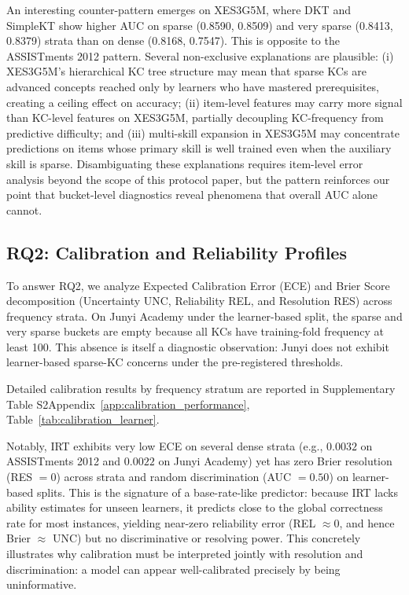 An interesting counter-pattern emerges on XES3G5M, where DKT and SimpleKT show higher AUC on sparse (0.8590, 0.8509) and very sparse (0.8413, 0.8379) strata than on dense (0.8168, 0.7547). This is opposite to the ASSISTments 2012 pattern. Several non-exclusive explanations are plausible: (i) XES3G5M's hierarchical KC tree structure may mean that sparse KCs are advanced concepts reached only by learners who have mastered prerequisites, creating a ceiling effect on accuracy; (ii) item-level features may carry more signal than KC-level features on XES3G5M, partially decoupling KC-frequency from predictive difficulty; and (iii) multi-skill expansion in XES3G5M may concentrate predictions on items whose primary skill is well trained even when the auxiliary skill is sparse. Disambiguating these explanations requires item-level error analysis beyond the scope of this protocol paper, but the pattern reinforces our point that bucket-level diagnostics reveal phenomena that overall AUC alone cannot.

\subsection{RQ2: Calibration and Reliability Profiles}
To answer RQ2, we analyze Expected Calibration Error (ECE) and Brier Score decomposition (Uncertainty UNC, Reliability REL, and Resolution RES) across frequency strata. On Junyi Academy under the learner-based split, the sparse and very sparse buckets are empty because all KCs have training-fold frequency at least 100. This absence is itself a diagnostic observation: Junyi does not exhibit learner-based sparse-KC concerns under the pre-registered thresholds.

Detailed calibration results by frequency stratum are reported in \ifdefined\iscompact Supplementary Table S2\else Appendix~\ref{app:calibration_performance}, Table~\ref{tab:calibration_learner}\fi.

Notably, IRT exhibits very low ECE on several dense strata (e.g., $0.0032$ on ASSISTments 2012 and $0.0022$ on Junyi Academy) yet has zero Brier resolution (RES $= 0$) across strata and random discrimination (AUC $= 0.50$) on learner-based splits. This is the signature of a base-rate-like predictor: because IRT lacks ability estimates for unseen learners, it predicts close to the global correctness rate for most instances, yielding near-zero reliability error (REL $\approx 0$, and hence Brier $\approx$ UNC) but no discriminative or resolving power. This concretely illustrates why calibration must be interpreted jointly with resolution and discrimination: a model can appear well-calibrated precisely by being uninformative.

